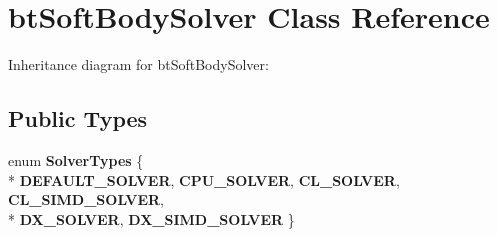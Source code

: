 \hypertarget{classbt_soft_body_solver}{\section{bt\+Soft\+Body\+Solver Class Reference}
\label{classbt_soft_body_solver}
}


Inheritance diagram for bt\+Soft\+Body\+Solver\+:
\subsection*{Public Types}
\begin{DoxyCompactItemize}
\item 
\hypertarget{classbt_soft_body_solver_ae50676e1c9c6cdb0e3e59bd426baf540}{enum {\bfseries Solver\+Types} \{ \\*
{\bfseries D\+E\+F\+A\+U\+L\+T\+\_\+\+S\+O\+L\+V\+E\+R}, 
{\bfseries C\+P\+U\+\_\+\+S\+O\+L\+V\+E\+R}, 
{\bfseries C\+L\+\_\+\+S\+O\+L\+V\+E\+R}, 
{\bfseries C\+L\+\_\+\+S\+I\+M\+D\+\_\+\+S\+O\+L\+V\+E\+R}, 
\\*
{\bfseries D\+X\+\_\+\+S\+O\+L\+V\+E\+R}, 
{\bfseries D\+X\+\_\+\+S\+I\+M\+D\+\_\+\+S\+O\+L\+V\+E\+R}
 \}}\label{classbt_soft_body_solver_ae50676e1c9c6cdb0e3e59bd426baf540}

\end{DoxyCompactItemize}
